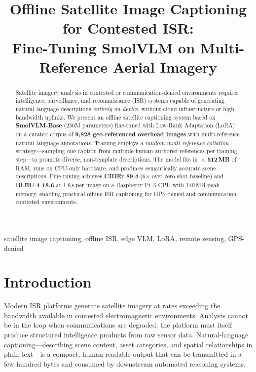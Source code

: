 \documentclass[conference]{IEEEtran}
\begin{document}
\title{Offline Satellite Image Captioning for Contested ISR:\\
Fine-Tuning SmolVLM on Multi-Reference Aerial Imagery}

\author{
}

\maketitle

\begin{abstract}
Satellite imagery analysis in contested or communication-denied environments requires
intelligence, surveillance, and reconnaissance (ISR) systems capable of generating natural-language
descriptions \emph{entirely on-device}, without cloud infrastructure or high-bandwidth uplinks.
We present an offline satellite captioning system based on \textbf{SmolVLM-Base} (256M parameters)
fine-tuned with Low-Rank Adaptation (LoRA) on a curated corpus of \textbf{9,828 geo-referenced
overhead images} with multi-reference natural-language annotations. Training employs a
\emph{random multi-reference collation} strategy---sampling one caption from multiple human-authored
references per training step---to promote diverse, non-template descriptions. The model fits in
\textbf{$<$512\,MB} of RAM, runs on CPU-only hardware, and produces semantically accurate scene
descriptions. Fine-tuning achieves \textbf{CIDEr 89.4} (6$\times$ over zero-shot baseline) and
\textbf{BLEU-4 18.6} at 1.8\,s per image on a Raspberry Pi~5 CPU with 140\,MB peak memory,
enabling practical offline ISR captioning for GPS-denied and communication-contested environments.
\end{abstract}

\begin{IEEEkeywords}
satellite image captioning, offline ISR, edge VLM, LoRA, remote sensing, GPS-denied
\end{IEEEkeywords}

\section{Introduction}
\label{sec:intro}

Modern ISR platforms generate satellite imagery at rates exceeding the bandwidth available in
contested electromagnetic environments. Analysts cannot be in the loop when communications are
degraded; the platform must itself produce structured intelligence products from raw sensor data.
Natural-language captioning---describing scene content, asset categories, and spatial relationships
in plain text---is a compact, human-readable output that can be transmitted in a few hundred bytes
and consumed by downstream automated reasoning systems.
\end{document}
